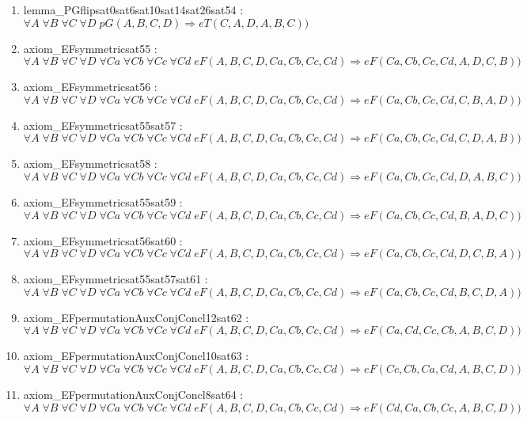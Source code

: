\documentclass{article}
\begin{document}
\begin{enumerate}
\item lemma\_PGflipsat0sat6sat10sat14sat26sat54 : $\forall A\;\forall B\;\forall C\;\forall D\;pG(A, B, C, D) \Rightarrow eT(C, A, D, A, B, C))$
\item axiom\_EFsymmetricsat55 : $\forall A\;\forall B\;\forall C\;\forall D\;\forall Ca\;\forall Cb\;\forall Cc\;\forall Cd\;eF(A, B, C, D, Ca, Cb, Cc, Cd) \Rightarrow eF(Ca, Cb, Cc, Cd, A, D, C, B))$
\item axiom\_EFsymmetricsat56 : $\forall A\;\forall B\;\forall C\;\forall D\;\forall Ca\;\forall Cb\;\forall Cc\;\forall Cd\;eF(A, B, C, D, Ca, Cb, Cc, Cd) \Rightarrow eF(Ca, Cb, Cc, Cd, C, B, A, D))$
\item axiom\_EFsymmetricsat55sat57 : $\forall A\;\forall B\;\forall C\;\forall D\;\forall Ca\;\forall Cb\;\forall Cc\;\forall Cd\;eF(A, B, C, D, Ca, Cb, Cc, Cd) \Rightarrow eF(Ca, Cb, Cc, Cd, C, D, A, B))$
\item axiom\_EFsymmetricsat58 : $\forall A\;\forall B\;\forall C\;\forall D\;\forall Ca\;\forall Cb\;\forall Cc\;\forall Cd\;eF(A, B, C, D, Ca, Cb, Cc, Cd) \Rightarrow eF(Ca, Cb, Cc, Cd, D, A, B, C))$
\item axiom\_EFsymmetricsat55sat59 : $\forall A\;\forall B\;\forall C\;\forall D\;\forall Ca\;\forall Cb\;\forall Cc\;\forall Cd\;eF(A, B, C, D, Ca, Cb, Cc, Cd) \Rightarrow eF(Ca, Cb, Cc, Cd, B, A, D, C))$
\item axiom\_EFsymmetricsat56sat60 : $\forall A\;\forall B\;\forall C\;\forall D\;\forall Ca\;\forall Cb\;\forall Cc\;\forall Cd\;eF(A, B, C, D, Ca, Cb, Cc, Cd) \Rightarrow eF(Ca, Cb, Cc, Cd, D, C, B, A))$
\item axiom\_EFsymmetricsat55sat57sat61 : $\forall A\;\forall B\;\forall C\;\forall D\;\forall Ca\;\forall Cb\;\forall Cc\;\forall Cd\;eF(A, B, C, D, Ca, Cb, Cc, Cd) \Rightarrow eF(Ca, Cb, Cc, Cd, B, C, D, A))$
\item axiom\_EFpermutationAuxConjConcl12sat62 : $\forall A\;\forall B\;\forall C\;\forall D\;\forall Ca\;\forall Cb\;\forall Cc\;\forall Cd\;eF(A, B, C, D, Ca, Cb, Cc, Cd) \Rightarrow eF(Ca, Cd, Cc, Cb, A, B, C, D))$
\item axiom\_EFpermutationAuxConjConcl10sat63 : $\forall A\;\forall B\;\forall C\;\forall D\;\forall Ca\;\forall Cb\;\forall Cc\;\forall Cd\;eF(A, B, C, D, Ca, Cb, Cc, Cd) \Rightarrow eF(Cc, Cb, Ca, Cd, A, B, C, D))$
\item axiom\_EFpermutationAuxConjConcl8sat64 : $\forall A\;\forall B\;\forall C\;\forall D\;\forall Ca\;\forall Cb\;\forall Cc\;\forall Cd\;eF(A, B, C, D, Ca, Cb, Cc, Cd) \Rightarrow eF(Cd, Ca, Cb, Cc, A, B, C, D))$

\end{enumerate}
\end{document}
